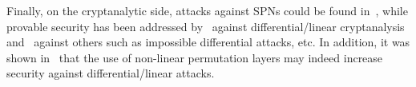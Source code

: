 Finally, on the cryptanalytic side, attacks against SPNs could be found in~\cite{EC:Joux03,RSA:HalRog04,JC:BirSha10,AC:BirBouKho14,cryptoeprint:2015:646,cryptoeprint:2015:646}, while provable security has been addressed by~\cite{IMA:DaeRij01,AC:PSCYL02,FSE:PSLL03,miles2015substitution} against differential/linear cryptanalysis and~\cite{EC:SLGRL16} against others such as impossible differential attacks, etc. In addition, it was shown in~\cite{DBLP:journals/dcc/LiuRL18} that the use of non-linear permutation layers may indeed increase security against differential/linear attacks.




